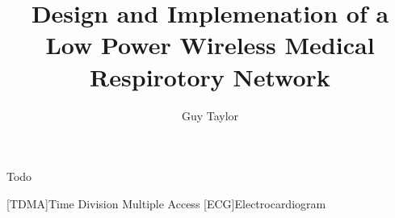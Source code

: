 \documentclass[bsc,logo,plainprepages,parskip,abbrevs,10pt]{infthesis}
\title{Design and Implemenation of a Low Power Wireless Medical Respirotory Network}
\author{Guy Taylor}
\begin{document}
\begin{preliminary}

\maketitle

\begin{acknowledgements}
  Todo
\end{acknowledgements}

\standarddeclaration

\tableofcontents

\listoffigures
\listoftables

\begin{acronym}
[TDMA]{Time Division Multiple Access}
[ECG]{Electrocardiogram}
\end{acronym}

\end{preliminary}









\appendix








\end{document}
